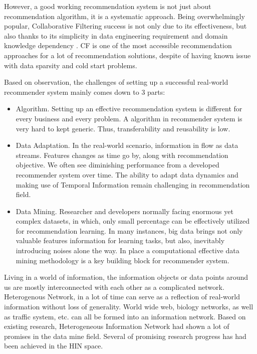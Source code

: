 However, a good working recommendation system is not just about recommendation algorithm, it is a systematic approach. Being overwhelmingly popular, Collaborative Filtering success is not only due to its effectiveness, but also thanks to its simplicity in data engineering requirement and domain knowledge dependency \citep{Amatriain2016}. CF is one of the most accessible recommendation approaches for a lot of recommendation solutions, despite of having known issue with data sparsity and cold start problems.

Based on observation, the challenges of setting up a successful real-world recommender system mainly comes down to 3 parts:  

\begin{itemize}
\item Algorithm. Setting up an effective recommendation system is different for every business and every problem. A algorithm in recommender system is very hard to kept generic. Thus, transferability and reusability is low.

\item Data Adaptation. In the real-world scenario, information in flow as data streams. Features changes as time go by, along with recommendation objective. We often see diminishing performance from a developed recommender system over time. The ability to adapt data dynamics and making use of Temporal Information remain challenging in recommendation field.

\item Data Mining. Researcher and developers normally facing enormous yet complex datasets, in which, only small percentage can be effectively utilized for recommendation learning. In many instances, big data brings not only valuable features information for learning tasks, but also, inevitably introducing noises alone the way. In place a computational effective data mining methodology is a key building block for recommender system.
 
\end{itemize}

Living in a world of information, the information objects or data points around us are mostly interconnected with each other as a complicated network. Heterogenous Network, in a lot of time can serve as a reflection of real-world information without loss of generality. World wide web, biology networks, as well as traffic system, etc. can all be formed into an information network. Based on existing research, Heterogeneous Information Network had shown a lot of promises in the data mine field. Several of promising research progress has had been achieved in the HIN space. 

